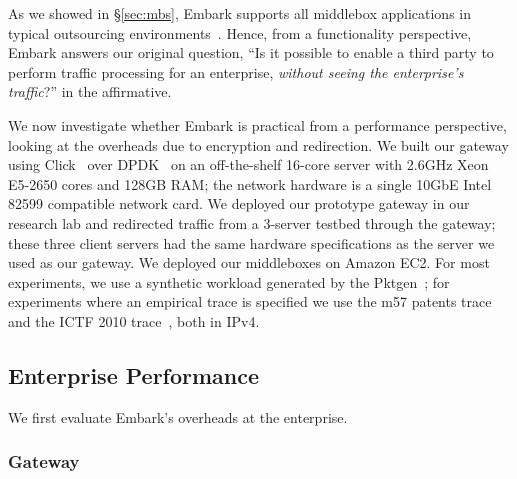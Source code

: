 \documentclass[letterpaper,twocolumn,10pt]{article}
\newcommand{\sys}{Embark\xspace} %
\begin{document}
As we showed in \S\ref{sec:mbs}, \sys supports all middlebox applications in typical outsourcing environments~\cite{aplomb,etsi-nfv}. Hence, from a functionality perspective, \sys answers our original question, ``Is it possible to enable a third party to perform traffic processing for an enterprise, {\em without seeing the enterprise's traffic}?''  in the affirmative.

We now investigate whether \sys is practical from a performance perspective, looking at the overheads due to encryption and redirection. 
We built our gateway using Click~\cite{click} over DPDK~\cite{dpdk} on an off-the-shelf 16-core server with 2.6GHz Xeon E5-2650 cores and 128GB RAM; the network hardware is a single 10GbE Intel 82599 compatible network card. 
We deployed our prototype gateway in our research lab and redirected traffic from a 3-server testbed through the gateway; these three client servers had the same hardware specifications as the server we used as our gateway.
We deployed our middleboxes on Amazon EC2.
For most experiments, we use a synthetic workload generated by the Pktgen~\cite{pktgen}; for experiments where an empirical trace is specified we use the m57 patents trace~\cite{m57} and the ICTF 2010 trace~\cite{ictf}, both in IPv4.


\subsection{Enterprise Performance}
\label{sec:enterprise}
We first evaluate \sys's overheads at the enterprise. %

\subsubsection{Gateway}
\end{document}
